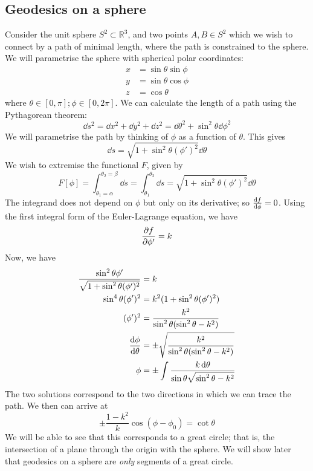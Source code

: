 \subsection{Geodesics on a sphere}
Consider the unit sphere \( S^2 \subset \mathbb R^3 \), and two points \( A, B \in S^2 \) which we wish to connect by a path of minimal length, where the path is constrained to the sphere.
We will parametrise the sphere with spherical polar coordinates:
\begin{align*}
	x & = \sin\theta \sin\phi \\
	y & = \sin\theta\cos\phi  \\
	z & = \cos\theta
\end{align*}
where \( \theta \in [0, \pi]; \phi \in [0, 2\pi] \).
We can calculate the length of a path using the Pythagorean theorem:
\[
	\dd{s}^2 = \dd{x}^2 + \dd{y}^2 + \dd{z}^2 = \dd{\theta}^2 + \sin^2 \theta \dd{\phi}^2
\]
We will parametrise the path by thinking of \( \phi \) as a function of \( \theta \).
This gives
\[
	\dd{s} = \sqrt{1 + \sin^2 \theta (\phi')^2} \dd{\theta}
\]
We wish to extremise the functional \( F \), given by
\[
	F[\phi] = \int_{\theta_1 = \alpha}^{\theta_2 = \beta} \dd{s} = \int_{\theta_1}^{\theta_2} \dd{s} = \sqrt{1 + \sin^2 \theta (\phi')^2} \dd{\theta}
\]
The integrand does not depend on \( \phi \) but only on its derivative; so \( \dv{f}{\phi} = 0 \).
Using the first integral form of the Euler-Lagrange equation, we have
\[
	\pdv{f}{\phi'} = k
\]
Now, we have
\begin{align*}
	\frac{\sin^2 \theta \phi'}{\sqrt{1 + \sin^2 \theta (\phi')^2}} & = k                                                                    \\
	\sin^4 \theta (\phi')^2                                        & = k^2 (1 + \sin^2 \theta (\phi')^2)                                    \\
	(\phi')^2                                                      & = \frac{k^2}{\sin^2 \theta (\sin^2 \theta - k^2)}                      \\
	\dv{\phi}{\theta}                                              & = \pm\sqrt{\frac{k^2}{\sin^2 \theta (\sin^2 \theta - k^2)}}            \\
	\phi                                                           & = \pm\int \frac{k \dd{\theta}}{\sin \theta \sqrt{\sin^2 \theta - k^2}} \\
\end{align*}
The two solutions correspond to the two directions in which we can trace the path.
We then can arrive at
\[
	\pm \frac{1 - k^2}{k} \cos(\phi - \phi_0) = \cot \theta
\]
We will be able to see that this corresponds to a great circle; that is, the intersection of a plane through the origin with the sphere.
We will show later that geodesics on a sphere are \textit{only} segments of a great circle.

